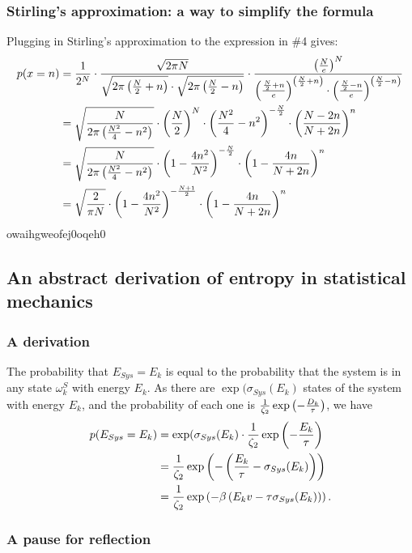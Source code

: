 \documentclass{paper}
\begin{document}
\subsubsection{Stirling's approximation: a way to simplify the formula}

\par Plugging in Stirling's approximation to the expression in \#4 gives:
    \begin{align*}
        p(x=n) &= \frac{1}{2^N} \cdot \frac{\sqrt{2\pi N}}{\sqrt{2\pi \left(\frac{N}{2} + n\right)} \cdot \sqrt{2\pi \left(\frac{N}{2} - n\right)}} \cdot \frac{\left(\frac{N}{e}\right)^N}{\left(\frac{\frac{N}{2} + n}{e}\right)^{\left(\frac{N}{2} + n\right)} \cdot \left(\frac{\frac{N}{2} - n}{e}\right)^{\left(\frac{N}{2} - n\right)}}\\
        &= \sqrt{\frac{N}{2\pi \left(\frac{N^2}{4} - n^2\right)}} \cdot \left(\frac{N}{2}\right)^N \cdot \left(\frac{N^2}{4} - n^2\right)^{-\frac{N}{2}} \cdot \left(\frac{N-2n}{N+2n}\right)^n \\
        &= \sqrt{\frac{N}{2\pi \left(\frac{N^2}{4} - n^2\right)}} \cdot \left(1 - \frac{4n^2}{N^2}\right)^{-\frac{N}{2}} \cdot \left(1 - \frac{4n}{N+2n}\right)^n \\
        &= \sqrt{\frac{2}{\pi N}} \cdot \left(1 - \frac{4n^2}{N^2}\right)^{-\frac{N+1}{2}} \cdot \left(1 - \frac{4n}{N+2n}\right)^n
    \end{align*}
    owaihgweofej0oqeh0

\subsection{An abstract derivation of entropy in statistical mechanics}
\subsubsection{A derivation}

\par The probability that $E_{Sys} = E_k$ is equal to the probability that the system is in any state $\omega^S_k$ with energy $E_k$.  As there are $\exp(\sigma_{Sys}(E_k)$ states of the system with energy $E_k$, and the probability of each one is $\frac{1}{\zeta_2}\exp\left(-\frac{D_k}{\tau}\right)$, we have
    \begin{align*}
        p(E_{Sys} = E_k) &= \exp(\sigma_{Sys}(E_k) \cdot \frac{1}{\zeta_2} \exp \left( - \frac{E_k}{\tau} \right) \\
        &= \frac{1}{\zeta_2} \exp \left( - \left( \frac{E_k}{\tau} - \sigma_{Sys}(E_k) \right) \right) \\
        &= \frac{1}{\zeta_2} \exp \left( -\beta \left( E_kv - \tau \sigma_{Sys}(E_k) \right) \right).
    \end{align*}
    
\subsubsection{A pause for reflection}

    
\end{document}
